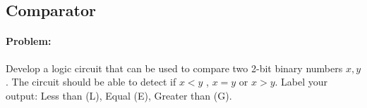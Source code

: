 \documentclass[12pt, a4paper]{report}
\newcommand{\implicantsol}[3][0]{
	\draw[rounded corners=3pt, fill=#3, opacity=0.3] ($(#2.north west)+(135:#1)$) rectangle ($(#2.south east)+(-45:#1)$);
}
\newenvironment{4kmap}[2]%
{
	\begin{tikzpicture}[baseline=(current bounding box.north),scale=0.8]
		\draw (0,0) grid (4,4);
		\draw (0,4) -- node [pos=0.7,above right,anchor=south west] {\tiny{#1}} node [pos=0.7,below left,anchor=north east] {\tiny{#2}} ++(135:1);
		\matrix (mapa) [matrix of nodes,
		column sep={0.8cm,between origins},
		row sep={0.8cm,between origins},
		every node/.style={minimum size=0.3mm},
		anchor=8.center,
		ampersand replacement=\&] at (0.5,0.5)
		{
			\& |(c00)| 00         \& |(c01)| 01         \& |(c11)| 11         \& |(c10)| 10         \& |(cf)| \phantom{00} \\
			|(r00)| 00             \& |(0)|  \phantom{0} \& |(1)|  \phantom{0} \& |(3)|  \phantom{0} \& |(2)|  \phantom{0} \&                     \\
			|(r01)| 01             \& |(4)|  \phantom{0} \& |(5)|  \phantom{0} \& |(7)|  \phantom{0} \& |(6)|  \phantom{0} \&                     \\
			|(r11)| 11             \& |(12)| \phantom{0} \& |(13)| \phantom{0} \& |(15)| \phantom{0} \& |(14)| \phantom{0} \&                     \\
			|(r10)| 10             \& |(8)|  \phantom{0} \& |(9)|  \phantom{0} \& |(11)| \phantom{0} \& |(10)| \phantom{0} \&                     \\
			|(rf) | \phantom{00}   \&                    \&                    \&                    \&                    \&                     \\
		};
	}%
	{
	\end{tikzpicture}
}
\newcommand{\contingut}[1]{%
	\foreach \x [count=\xi from 0]  in {#1}
	\path (\xi) node {\x};
}
\begin{document}
	
	
	
	
	\newpage
	\subsection{Comparator}
	\paragraph*{Problem: }
	Develop a logic circuit that can be used to compare two 2-bit binary numbers $x, y$. The circuit should be able to detect if $x<y$ , $x=y$ or $x>y$. Label your output: Less than (L), Equal (E), Greater than (G).
	
\end{document}
